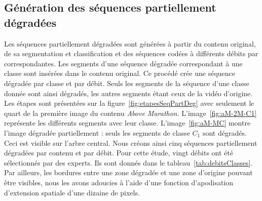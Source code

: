 \subsection{Génération des séquences partiellement dégradées}
Les séquences partiellement dégradées sont générées à partir du contenu original, de sa segmentation et classification et des séquences codées à différents débits par \avc{} correspondantes. Les segments d'une séquence dégradée correspondant à une classe sont insérées dans le contenu original. Ce procédé crée une séquence dégradée par classe et par débit. Seuls les segments de la séquence d'une classe donnée sont ainsi dégradés, les autres segments étant ceux de la vidéo d'origine. Les étapes sont présentées sur la figure~\ref{fig:etapesSeqPartDeg} avec seulement le quart de la première image du contenu \emph{Above Marathon}. L'image~\ref{fig:aM-2M-C1} représente les différents segments avec leur classe. L'image~\ref{fig:aM-MC} montre l'image dégradée partiellement : seuls les segments de classe $C_1$ sont dégradés. Ceci est visible sur l'arbre central. Nous créons ainsi cinq séquences partiellement dégradées par contenu et par débit. Pour cette étude, vingt débits ont été sélectionnés par des experts. Ils sont donnés dans le tableau~\ref{tab:debitsClasses}. Par ailleurs, les bordures entre une zone dégradée et une zone d'origine pouvant être visibles, nous les avons adoucies à l'aide d'une fonction d'apodisation d'extension spatiale d'une dizaine de pixels.

